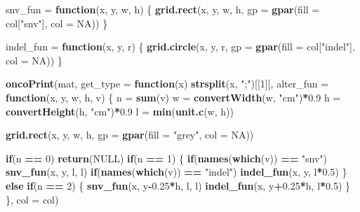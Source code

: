 \documentclass[]{book}
\newenvironment{Shaded}{\begin{snugshade}}{\end{snugshade}}
\newcommand{\KeywordTok}[1]{\textcolor[rgb]{0.13,0.29,0.53}{\textbf{#1}}}
\newcommand{\DataTypeTok}[1]{\textcolor[rgb]{0.13,0.29,0.53}{#1}}
\newcommand{\DecValTok}[1]{\textcolor[rgb]{0.00,0.00,0.81}{#1}}
\newcommand{\FloatTok}[1]{\textcolor[rgb]{0.00,0.00,0.81}{#1}}
\newcommand{\StringTok}[1]{\textcolor[rgb]{0.31,0.60,0.02}{#1}}
\newcommand{\OtherTok}[1]{\textcolor[rgb]{0.56,0.35,0.01}{#1}}
\newcommand{\ControlFlowTok}[1]{\textcolor[rgb]{0.13,0.29,0.53}{\textbf{#1}}}
\newcommand{\OperatorTok}[1]{\textcolor[rgb]{0.81,0.36,0.00}{\textbf{#1}}}
\newcommand{\NormalTok}[1]{#1}
\theoremstyle{definition}
\theoremstyle{definition}
\theoremstyle{definition}
\theoremstyle{remark}
\begin{document}
\begin{Shaded}
\begin{Highlighting}[]
\NormalTok{snv_fun =}\StringTok{ }\ControlFlowTok{function}\NormalTok{(x, y, w, h) \{}
    \KeywordTok{grid.rect}\NormalTok{(x, y, w, h, }\DataTypeTok{gp =} \KeywordTok{gpar}\NormalTok{(}\DataTypeTok{fill =}\NormalTok{ col[}\StringTok{"snv"}\NormalTok{], }\DataTypeTok{col =} \OtherTok{NA}\NormalTok{))}
\NormalTok{\}}

\NormalTok{indel_fun =}\StringTok{ }\ControlFlowTok{function}\NormalTok{(x, y, r) \{}
    \KeywordTok{grid.circle}\NormalTok{(x, y, r, }\DataTypeTok{gp =} \KeywordTok{gpar}\NormalTok{(}\DataTypeTok{fill =}\NormalTok{ col[}\StringTok{"indel"}\NormalTok{], }\DataTypeTok{col =} \OtherTok{NA}\NormalTok{))}
\NormalTok{\}}

\KeywordTok{oncoPrint}\NormalTok{(mat, }\DataTypeTok{get_type =} \ControlFlowTok{function}\NormalTok{(x) }\KeywordTok{strsplit}\NormalTok{(x, }\StringTok{";"}\NormalTok{)[[}\DecValTok{1}\NormalTok{]],}
    \DataTypeTok{alter_fun =} \ControlFlowTok{function}\NormalTok{(x, y, w, h, v) \{}
\NormalTok{        n =}\StringTok{ }\KeywordTok{sum}\NormalTok{(v)}
\NormalTok{        w =}\StringTok{ }\KeywordTok{convertWidth}\NormalTok{(w, }\StringTok{"cm"}\NormalTok{)}\OperatorTok{*}\FloatTok{0.9}
\NormalTok{        h =}\StringTok{ }\KeywordTok{convertHeight}\NormalTok{(h, }\StringTok{"cm"}\NormalTok{)}\OperatorTok{*}\FloatTok{0.9}
\NormalTok{        l =}\StringTok{ }\KeywordTok{min}\NormalTok{(}\KeywordTok{unit.c}\NormalTok{(w, h))}

        \KeywordTok{grid.rect}\NormalTok{(x, y, w, h, }\DataTypeTok{gp =} \KeywordTok{gpar}\NormalTok{(}\DataTypeTok{fill =} \StringTok{"grey"}\NormalTok{, }\DataTypeTok{col =} \OtherTok{NA}\NormalTok{))}

        \ControlFlowTok{if}\NormalTok{(n }\OperatorTok{==}\StringTok{ }\DecValTok{0}\NormalTok{) }\KeywordTok{return}\NormalTok{(}\OtherTok{NULL}\NormalTok{)}
        \ControlFlowTok{if}\NormalTok{(n }\OperatorTok{==}\StringTok{ }\DecValTok{1}\NormalTok{) \{}
            \ControlFlowTok{if}\NormalTok{(}\KeywordTok{names}\NormalTok{(}\KeywordTok{which}\NormalTok{(v)) }\OperatorTok{==}\StringTok{ "snv"}\NormalTok{) }\KeywordTok{snv_fun}\NormalTok{(x, y, l, l)}
            \ControlFlowTok{if}\NormalTok{(}\KeywordTok{names}\NormalTok{(}\KeywordTok{which}\NormalTok{(v)) }\OperatorTok{==}\StringTok{ "indel"}\NormalTok{) }\KeywordTok{indel_fun}\NormalTok{(x, y, l}\OperatorTok{*}\FloatTok{0.5}\NormalTok{)}
\NormalTok{        \} }\ControlFlowTok{else} \ControlFlowTok{if}\NormalTok{(n }\OperatorTok{==}\StringTok{ }\DecValTok{2}\NormalTok{) \{}
            \KeywordTok{snv_fun}\NormalTok{(x, y}\OperatorTok{-}\FloatTok{0.25}\OperatorTok{*}\NormalTok{h, l, l)}
            \KeywordTok{indel_fun}\NormalTok{(x, y}\OperatorTok{+}\FloatTok{0.25}\OperatorTok{*}\NormalTok{h, l}\OperatorTok{*}\FloatTok{0.5}\NormalTok{)}
\NormalTok{        \}}
\NormalTok{    \}, }\DataTypeTok{col =}\NormalTok{ col)}
\end{Highlighting}
\end{Shaded}
\end{document}
